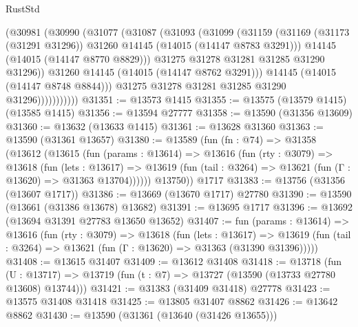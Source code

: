 \begin{lexlean}{RustStd}
\begin{coremodule}
                      (@30981
                        (@30990
                          (@31077
                            (@31087
                              (@31093
                                (@31099
                                  (@31159
                                    (@31169
                                      (@31173 (@31291 @31296))
                                      @31260
                                      @14145
                                      (@14015 (@14147 @8783 @3291)))
                                    @14145
                                    (@14015 (@14147 @8770 @8829)))
                                  @31275
                                  @31278
                                  @31281
                                  @31285
                                  @31290
                                  @31296))
                              @31260
                              @14145
                              (@14015 (@14147 @8762 @3291)))
                            @14145
                            (@14015 (@14147 @8748 @8844)))
                          @31275
                          @31278
                          @31281
                          @31285
                          @31290
                          @31296)))))))))))
@31351 := @13573 @1415
@31355 := @13575 (@13579 @1415) (@13585 @1415)
@31356 := @13594 @27777
@31358 := @13590 (@31356 @13609)
@31360 := @13632 (@13633 @1415)
@31361 := @13628 @31360
@31363 := @13590 (@31361 @13657)
@31380 := @13589
    (fun (fn : @74) =>
    @31358
      (@13612
        (@13615
          (fun (params : @13614) =>
          @13616
            (fun (rty : @3079) =>
            @13618
              (fun (lets : @13617) =>
              @13619 (fun (tail : @3264) => @13621 (fun (Γ : @13620) => @31363 @13704))))))
        @13750))
    @1717
@31383 := @13756 (@31356 (@13607 @1717))
@31386 := @13669 (@13670 @1717) @27780
@31390 := @13590 (@13661 (@31386 @13678) @13682)
@31391 := @13695 @1717
@31396 := @13692 (@13694 @31391 @27783 @13650 @13652)
@31407 := fun (params : @13614) =>
  @13616
    (fun (rty : @3079) =>
    @13618
      (fun (lets : @13617) =>
      @13619 (fun (tail : @3264) => @13621 (fun (Γ : @13620) => @31363 (@31390 @31396)))))
@31408 := @13615 @31407
@31409 := @13612 @31408
@31418 := @13718
    (fun (U : @13717) => @13719 (fun (t : @7) => @13727 (@13590 (@13733 @27780 @13608) @13744)))
@31421 := @31383 (@31409 @31418) @27778
@31423 := @13575 @31408 @31418
@31425 := @13805 @31407 @8862
@31426 := @13642 @8862
@31430 := @13590 (@31361 (@13640 (@31426 @13655)))

\end{coremodule}
\end{lexlean}
